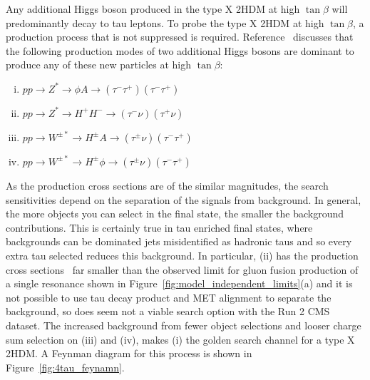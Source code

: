 Any additional Higgs boson produced in the type X \ac{2HDM} at high $\tan\beta$ will predominantly decay to tau leptons.
To probe the type X \ac{2HDM} at high $\tan\beta$, a production process that is not suppressed is required.
Reference~\cite{Jueid:2021avn} discusses that the following production modes of two additional Higgs bosons are dominant to produce any of these new particles at high $\tan\beta$:
\begin{enumerate}[i)]
  \item $pp \rightarrow Z^{*} \rightarrow \phi A \rightarrow (\tau^{-}\tau^{+})(\tau^{-}\tau^{+})$
  \item $pp \rightarrow Z^{*} \rightarrow H^{+}H^{-} \rightarrow (\tau^{-}\nu)(\tau^{+}\nu)$
  \item $pp \rightarrow W^{\pm *} \rightarrow H^{\pm}A \rightarrow (\tau^{\pm}\nu)(\tau^{-}\tau^{+})$
  \item $pp \rightarrow W^{\pm *} \rightarrow H^{\pm}\phi \rightarrow (\tau^{\pm}\nu)(\tau^{-}\tau^{+})$
\end{enumerate}
As the production cross sections are of the similar magnitudes, the search sensitivities depend on the separation of the signals from background.
In general, the more objects you can select in the final state, the smaller the background contributions.
This is certainly true in tau enriched final states, where backgrounds can be dominated jets misidentified as hadronic taus and so every extra tau selected reduces this background.
In particular, (ii) has the production cross sections~\cite{Jueid:2021avn} far smaller than the observed limit for gluon fusion production of a single resonance shown in Figure~\ref{fig:model_independent_limits}(a) and it is not possible to use tau decay product and \ac{MET} alignment to separate the background, so does seem not a viable search option with the Run 2 \ac{CMS} dataset.
The increased background from fewer object selections and looser charge sum selection on (iii) and (iv), makes (i) the golden search channel for a type X \ac{2HDM}. 
A Feynman diagram for this process is shown in Figure~\ref{fig:4tau_feynamn}. \\

